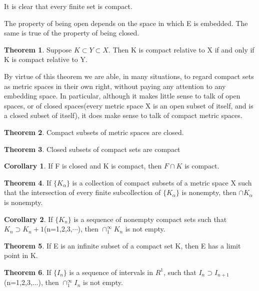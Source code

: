 \documentclass{article}
\theoremstyle{definition}
\newtheorem{theo}{Theorem}
\newtheorem{coro}{Corollary}
\theoremstyle{remark}
\begin{document}
	It is clear that every finite set is compact.
	
	The property of being open depends on the space in which E is embedded. The same is true of the property of being closed.
	
	\begin{theo}
		Suppose $K\subset Y\subset X$. Then K is compact relative to X if and only if K is compact relative to Y. 
	\end{theo}
	
	By virtue of this theorem we are able, in many situations, to regard compact sets as metric spaces in their own right, without paying any attention to any embedding space. In particular, although it makes little sense to talk of open spaces, or of closed spaces(every metric space X is an open subset of itself, and is a closed subset of itself), it does make sense to talk of compact metric spaces.
	
	\begin{theo}
		Compact subsets of metric spaces are closed.
	\end{theo}  
		
	\begin{theo}
		Closed subsets of compact sets are compact
	\end{theo}
	
	\begin{coro}
		If F is closed and K is compact, then $F\cap K$ is compact.
	\end{coro}	
	
	\begin{theo}
		If $\{K_\alpha\}$ is a collection of compact subsets of a metric space X such that the intersection of every finite subcollection of $\{K_\alpha\}$ is nonempty, then $\cap K_\alpha$ is nonempty.
	\end{theo}
	
	\begin{coro}
		If $\{K_n\}$ is a sequence of nonempty compact sets such that $K_n\supset K_n+1$(n=1,2,3,$\cdots$), then $\cap^\infty_1 K_n$ is not empty.
	\end{coro}
	
	\begin{theo}
		If E is an infinite subset of a compact set K, then E has a limit point in K.
	\end{theo}
	
	\begin{theo}
		If $\{I_n\}$ is a sequence of intervals in $R^1$, such that $I_n\supset I_{n+1}$(n=1,2,3,...), then $\cap^\infty_1 I_n$ is not empty.
	\end{theo}
	
\end{document}
